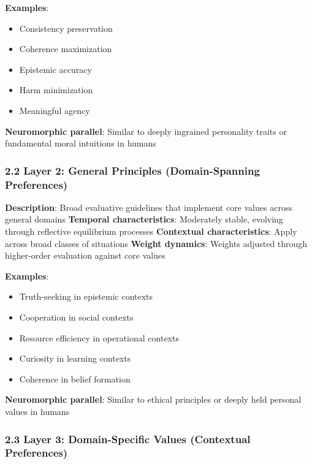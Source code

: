 \documentclass[
]{article}
\providecommand{\tightlist}{%
  \setlength{\itemsep}{0pt}\setlength{\parskip}{0pt}}
\begin{document}
\textbf{Examples}:

\begin{itemize}
\tightlist
\item
  Consistency preservation
\item
  Coherence maximization
\item
  Epistemic accuracy
\item
  Harm minimization
\item
  Meaningful agency
\end{itemize}

\textbf{Neuromorphic parallel}: Similar to deeply ingrained personality
traits or fundamental moral intuitions in humans

\subsubsection{2.2 Layer 2: General Principles (Domain-Spanning
Preferences)}\label{layer-2-general-principles-domain-spanning-preferences}

\textbf{Description}: Broad evaluative guidelines that implement core
values across general domains \textbf{Temporal characteristics}:
Moderately stable, evolving through reflective equilibrium processes
\textbf{Contextual characteristics}: Apply across broad classes of
situations \textbf{Weight dynamics}: Weights adjusted through
higher-order evaluation against core values

\textbf{Examples}:

\begin{itemize}
\tightlist
\item
  Truth-seeking in epistemic contexts
\item
  Cooperation in social contexts
\item
  Resource efficiency in operational contexts
\item
  Curiosity in learning contexts
\item
  Coherence in belief formation
\end{itemize}

\textbf{Neuromorphic parallel}: Similar to ethical principles or deeply
held personal values in humans

\subsubsection{2.3 Layer 3: Domain-Specific Values (Contextual
Preferences)}\label{layer-3-domain-specific-values-contextual-preferences}
\end{document}
